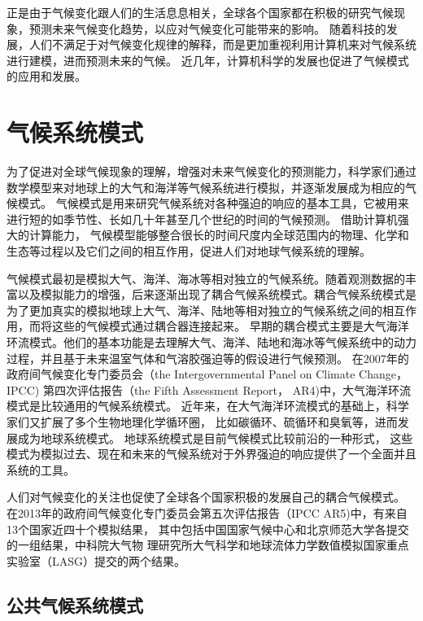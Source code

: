  
正是由于气候变化跟人们的生活息息相关，全球各个国家都在积极的研究气候现象，预测未来气候变化趋势，以应对气候变化可能带来的影响。 
随着科技的发展，人们不满足于对气候变化规律的解释，而是更加重视利用计算机来对气候系统进行建模，进而预测未来的气候。
近几年，计算机科学的发展也促进了气候模式的应用和发展。  



 
\section{气候系统模式}

为了促进对全球气候现象的理解，增强对未来气候变化的预测能力，科学家们通过数学模型来对地球上的大气和海洋等气候系统进行模拟，并逐渐发展成为相应的气候模式。
气候模式是用来研究气候系统对各种强迫的响应的基本工具，它被用来进行短的如季节性、长如几十年甚至几个世纪的时间的气候预测。 
借助计算机强大的计算能力， 气候模型能够整合很长的时间尺度内全球范围内的物理、化学和生态等过程以及它们之间的相互作用，促进人们对地球气候系统的理解\cite{hurrell2013community}。


气候模式最初是模拟大气、海洋、海冰等相对独立的气候系统。随着观测数据的丰富以及模拟能力的增强，后来逐渐出现了耦合气候系统模式。耦合气候系统模式是为了更加真实的模拟地球上大气、海洋、陆地等相对独立的气候系统之间的相互作用，而将这些的气候模式通过耦合器连接起来\cite{hurrell2013community, liu2014c}。
早期的耦合模式主要是大气海洋环流模式。他们的基本功能是去理解大气、海洋、陆地和海冰等气候系统中的动力过程，并且基于未来温室气体和气溶胶强迫等的假设进行气候预测。
在2007年的政府间气候变化专门委员会（the
Intergovernmental Panel on Climate Change， IPCC) 第四次评估报告（the Fifth Assessment
Report， AR4)中，大气海洋环流模式是比较通用的气候系统模式\cite{solomon2007climate}。
近年来，在大气海洋环流模式的基础上，科学家们又扩展了多个生物地理化学循环圈， 比如碳循环、硫循环和臭氧等，进而发展成为地球系统模式。 地球系统模式是目前气候模式比较前沿的一种形式，
这些模式为模拟过去、现在和未来的气候系统对于外界强迫的响应提供了一个全面并且系统的工具。 

人们对气候变化的关注也促使了全球各个国家积极的发展自己的耦合气候模式。
在2013年的政府间气候变化专门委员会第五次评估报告（IPCC AR5)中，有来自13个国家近四十个模拟结果，
其中包括中国国家气候中心和北京师范大学各提交的一组结果，中科院大气物
理研究所大气科学和地球流体力学数值模拟国家重点实验室（LASG）提交的两个结果\cite{stocker2013ipcc}。



\subsection{公共气候系统模式}
 

